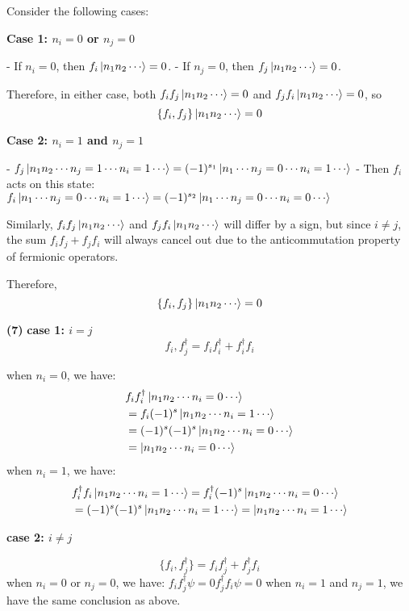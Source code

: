 \documentclass[12pt]{article}
\begin{document}
Consider the following cases:

\textbf{Case 1: $n_i = 0$ or $n_j = 0$}

- If $n_i = 0$, then $f_i \ket{n_1 n_2 \cdots} = 0$.
- If $n_j = 0$, then $f_j \ket{n_1 n_2 \cdots} = 0$.

Therefore, in either case, both $f_i f_j \ket{n_1 n_2 \cdots} = 0$ and $f_j f_i \ket{n_1 n_2 \cdots} = 0$, so
\[
\{f_i, f_j\} \ket{n_1 n_2 \cdots} = 0
\]

\textbf{Case 2: $n_i = 1$ and $n_j = 1$}

- $f_j \ket{n_1 n_2 \cdots n_j = 1 \cdots n_i = 1 \cdots} = (-1)^{s_1} \ket{n_1 \cdots n_j = 0 \cdots n_i = 1 \cdots}$
- Then $f_i$ acts on this state: $f_i \ket{n_1 \cdots n_j = 0 \cdots n_i = 1 \cdots} = (-1)^{s_2} \ket{n_1 \cdots n_j = 0 \cdots n_i = 0 \cdots}$

Similarly, $f_i f_j \ket{n_1 n_2 \cdots}$ and $f_j f_i \ket{n_1 n_2 \cdots}$ will differ by a sign, but since $i \neq j$, the sum $f_i f_j + f_j f_i$ will always cancel out due to the anticommutation property of fermionic operators.

Therefore,
\[
\{f_i, f_j\} \ket{n_1 n_2 \cdots} = 0
\]

\textbf{(7)}
\textbf{case 1: $i=j$}
\[
{f_i,f_j^\dagger} = f_i f_i^\dagger + f_i^\dagger f_i
\]

when $ n_i=0$, we have:
\[
\begin{aligned}
&f_i f_i^\dagger \ket{n_1 n_2 \cdots n_i=0 \cdots}  \\
&=f_i (-1)^s \ket{n_1 n_2 \cdots n_i=1 \cdots}  \\
&=(-1)^s (-1)^s \ket{n_1 n_2 \cdots n_i=0 \cdots} \\
&=\ket{n_1 n_2 \cdots n_i=0 \cdots} \\
\end{aligned}
\]
when $ n_i=1$, we have: 
\begin{equation*}\begin{aligned}
&f_i^\dagger f_i \ket{n_1 n_2 \cdots n_i=1 \cdots} = f_i^\dagger (-1)^s \ket{n_1 n_2 \cdots n_i=0 \cdots} \\
&=(-1)^s (-1)^s \ket{n_1 n_2 \cdots n_i=1 \cdots}=\ket{n_1 n_2 \cdots n_i=1 \cdots}\\
\end{aligned}
\end{equation*}


\textbf{case 2: $i\neq j$}

\[
\{f_i, f_j^\dagger\} = f_i f_j^\dagger + f_j^\dagger f_i
\]
when $ n_i=0$ or $n_j=0$, we have:
$f_if_j^\dagger\psi=0 f_j^\dagger f_i\psi=0$
when $ n_i=1$ and $n_j=1$, we have the same conclusion as above.
\end{document}
